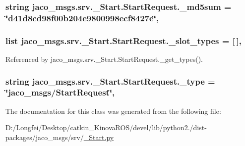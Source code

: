 \subsubsection[{\texorpdfstring{\+\_\+md5sum}{_md5sum}}]{\setlength{\rightskip}{0pt plus 5cm}string jaco\+\_\+msgs.\+srv.\+\_\+\+Start.\+Start\+Request.\+\_\+md5sum = \char`\"{}d41d8cd98f00b204e9800998ecf8427e\char`\"{}\hspace{0.3cm}{\ttfamily [static]}, {\ttfamily [private]}}\hypertarget{classjaco__msgs_1_1srv_1_1__Start_1_1StartRequest_ae5f1b3824e2164a21e656114cfc72fb8}{}\label{classjaco__msgs_1_1srv_1_1__Start_1_1StartRequest_ae5f1b3824e2164a21e656114cfc72fb8}
\subsubsection[{\texorpdfstring{\+\_\+slot\+\_\+types}{_slot_types}}]{\setlength{\rightskip}{0pt plus 5cm}list jaco\+\_\+msgs.\+srv.\+\_\+\+Start.\+Start\+Request.\+\_\+slot\+\_\+types = \mbox{[}$\,$\mbox{]}\hspace{0.3cm}{\ttfamily [static]}, {\ttfamily [private]}}\hypertarget{classjaco__msgs_1_1srv_1_1__Start_1_1StartRequest_a0fc9f81638c4647f695ef36a4300da59}{}\label{classjaco__msgs_1_1srv_1_1__Start_1_1StartRequest_a0fc9f81638c4647f695ef36a4300da59}


Referenced by jaco\+\_\+msgs.\+srv.\+\_\+\+Start.\+Start\+Request.\+\_\+get\+\_\+types().

\subsubsection[{\texorpdfstring{\+\_\+type}{_type}}]{\setlength{\rightskip}{0pt plus 5cm}string jaco\+\_\+msgs.\+srv.\+\_\+\+Start.\+Start\+Request.\+\_\+type = \char`\"{}jaco\+\_\+msgs/{\bf Start\+Request}\char`\"{}\hspace{0.3cm}{\ttfamily [static]}, {\ttfamily [private]}}\hypertarget{classjaco__msgs_1_1srv_1_1__Start_1_1StartRequest_ae3aa3a437ec579042f0a69a5cbe3a472}{}\label{classjaco__msgs_1_1srv_1_1__Start_1_1StartRequest_ae3aa3a437ec579042f0a69a5cbe3a472}


The documentation for this class was generated from the following file\+:\begin{DoxyCompactItemize}
\item 
D\+:/\+Longfei/\+Desktop/catkin\+\_\+\+Kinova\+R\+O\+S/devel/lib/python2./dist-\/packages/jaco\+\_\+msgs/srv/\hyperlink{__Start_8py}{\+\_\+\+Start.\+py}\end{DoxyCompactItemize}
